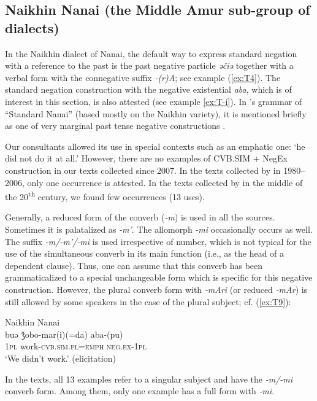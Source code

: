 \documentclass[output=paper]{langscibook}
\begin{document}
\subsection{Naikhin Nanai (the Middle Amur sub-group of dialects)}\label{sec:T5.1}

In the Naikhin dialect of Nanai, the default way to express standard negation with a reference to the past is the past negative particle \textit{əčiə} together with a verbal form with the connegative suffix \textit{-(r)A}; see example (\ref{ex:T4}). The standard negation construction with the negative existential \textit{aba}, which is of interest in this section, is also attested (see example \ref{ex:T-i}). In \citeauthor{avrorin1961a}’s grammar of “Standard Nanai” (based mostly on the Naikhin variety), it is mentioned briefly as one of very marginal past tense negative constructions \citeyearpar[108]{avrorin1961a}.

Our consultants allowed its use in special contexts such as an emphatic one: ‘he did not do it at all.’ However, there are no examples of CVB.SIM + NegEx construction in our texts collected since 2007. In the texts collected by \citet{beljdy2012a} in 1980–2006, only one occurrence is attested. In the texts collected by \citet{avrorin1986a} in the middle of the 20\textsuperscript{th} century, we found few occurrences (13 uses).

Generally, a reduced form of the converb (\textit{-m}) is used in all the sources. Sometimes it is palatalized as \textit{‑m'}. The allomorph \textit{‑mi} occasionally occurs as well. The suffix \textit{-m/-m'/-mi} is used irrespective of number, which is not typical for the use of the simultaneous converb in its main function (i.e., as the head of a dependent clause). Thus, one can assume that this converb has been grammaticalized to a special unchangeable form which is specific for this negative construction. However, the plural converb form with \textit{‑mAri} (or reduced \textit{‑mAr}) is still allowed by some speakers in the case of the plural subject; cf. (\ref{ex:T9}):

\ea Naikhin Nanai \label{ex:T9}\\
	\gll buə	ǯobo-mar(i)(=da)	aba-(pu)\\
	\textsc{1pl}	work-\textsc{cvb.sim.pl=emph}	\textsc{neg.ex-1pl}\\
	\glt `We didn’t work.' (elicitation)
\z

In the texts, all 13 examples refer to a singular subject and have the \textit{-m/-mi} converb form. Among them, only one example has a full form with \textit{‑mi}.
\end{document}
